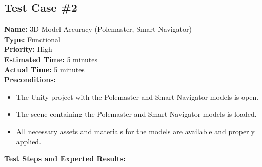 \documentclass[11pt]{article}
\begin{document}
\subsection{Test Case \#2}
\textbf{Name:} 3D Model Accuracy (Polemaster, Smart Navigator) \\
\textbf{Type:} Functional \\
\textbf{Priority:} High \\
\textbf{Estimated Time:} 5 minutes \\
\textbf{Actual Time:} 5 minutes \\
\textbf{Preconditions:} 
\begin{itemize}
\item The Unity project with the Polemaster and Smart Navigator models is open.
\item The scene containing the Polemaster and Smart Navigator models is loaded.
\item All necessary assets and materials for the models are available and properly applied.
\end{itemize}
\textbf{Test Steps and Expected Results:} \\
\end{document}
